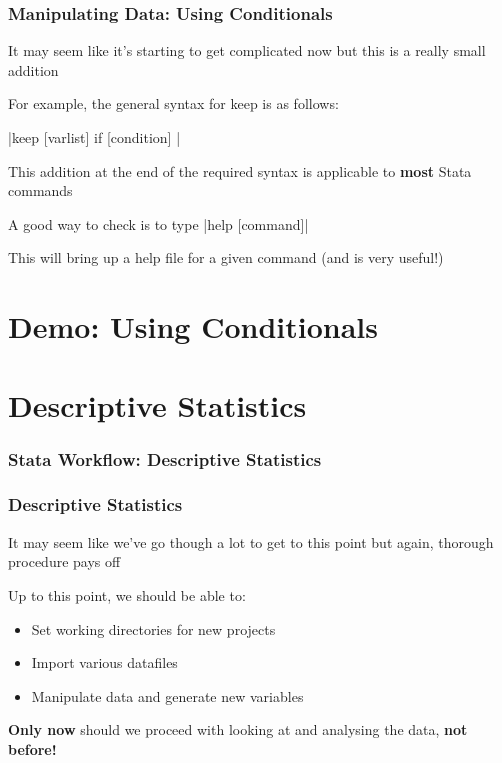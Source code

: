 \documentclass[10pt, compress]{beamer}
\begin{document}
\begin{frame}[fragile]
\frametitle{Manipulating Data: Using Conditionals}
It may seem like it's starting to get complicated now but this is a really small addition

For example, the \alert{general syntax} for \alert{keep} is as follows:

\begin{center}
|keep [varlist] if [condition] |
\end{center}

This addition at the end of the \alert{required} syntax is applicable to \textbf{most} Stata commands

A good way to check is to type |help [command]|

This will bring up a help file for a given command (\alert{and is very useful!})

\end{frame}

\section{Demo: Using Conditionals}

\section{Descriptive Statistics}

\begin{frame}[fragile]
\frametitle{Stata Workflow: Descriptive Statistics}
\begin{center}
\usetikzlibrary{shapes.geometric} %
\end{center}	
\end{frame}

\begin{frame}[fragile]
\frametitle{Descriptive Statistics}
	It may seem like we've go though a lot to get to this point but again, 
	\alert{thorough procedure pays off}
	
	Up to this point, we should be able to:
	
	\begin{itemize}
		\item Set working directories for new projects
		\item Import various datafiles
		\item Manipulate data and generate new variables
	\end{itemize}
	
	\textbf{Only now} should we proceed with looking at and analysing the data, \textbf{not before!}
\end{frame}
\end{document}
